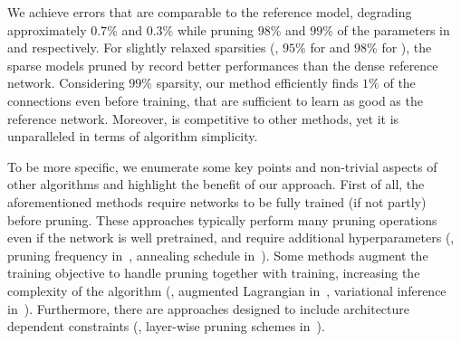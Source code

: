 We achieve errors that are comparable to the reference model, degrading approximately $0.7$\% and $0.3$\% while pruning $98$\% and $99$\% of the parameters in  and  respectively.
For slightly relaxed sparsities (\ie, $95$\% for  and $98$\% for ), the sparse models pruned by \snip{} record better performances than the dense reference network.
Considering $99\%$ sparsity, our method efficiently finds $1\%$ of the connections even before training, that are sufficient to learn as good as the reference network.
Moreover, \snip{} is competitive to other methods, yet it is unparalleled in terms of algorithm simplicity.


To be more specific, we enumerate some key points and non-trivial aspects of other algorithms and highlight the benefit of our approach.
First of all, the aforementioned methods require networks to be fully trained (if not partly) before pruning.
These approaches typically perform many pruning operations even if the network is well pretrained, and require additional hyperparameters (\eg, pruning frequency in~\cite{guo2016dynamic}, annealing schedule in~\cite{Carreira-Perpiñán_2018_CVPR}).
Some methods augment the training objective to handle pruning together with training, increasing the complexity of the algorithm (\eg, augmented Lagrangian in~\cite{Carreira-Perpiñán_2018_CVPR}, variational inference in~\cite{molchanov2017variational}).  
Furthermore, there are approaches designed to include architecture dependent constraints (\eg, layer-wise pruning schemes in~\cite{dong2017learning}).
 

